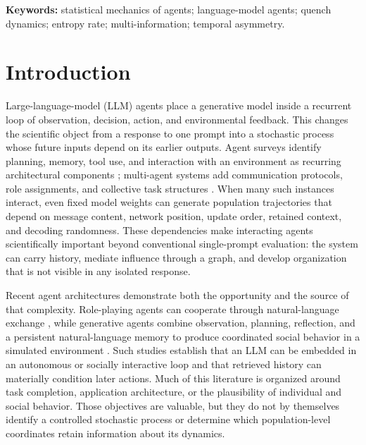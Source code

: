 \documentclass[12pt]{article}
\begin{document}
\noindent\textbf{Keywords:} statistical mechanics of agents; language-model
agents; quench dynamics; entropy rate; multi-information; temporal asymmetry.

\section{Introduction}
\label{sec:introduction}

Large-language-model (LLM) agents place a generative model inside a recurrent
loop of observation, decision, action, and environmental feedback.  This
changes the scientific object from a response to one prompt into a stochastic
process whose future inputs depend on its earlier outputs.  Agent surveys
identify planning, memory, tool use, and interaction with an environment as
recurring architectural components \cite{wang2024agents}; multi-agent systems
add communication protocols, role assignments, and collective task structures
\cite{guo2024multiagents}.  When many such instances interact, even fixed
model weights can generate population trajectories that depend on message
content, network position, update order, retained context, and decoding
randomness.  These dependencies make interacting agents scientifically
important beyond conventional single-prompt evaluation: the system can carry
history, mediate influence through a graph, and develop organization that is
not visible in any isolated response.

Recent agent architectures demonstrate both the opportunity and the source of
that complexity.  Role-playing agents can cooperate through natural-language
exchange \cite{li2023camel}, while generative agents combine observation,
planning, reflection, and a persistent natural-language memory to produce
coordinated social behavior in a simulated environment
\cite{park2023generative}.  Such studies establish that an LLM can be embedded
in an autonomous or socially interactive loop and that retrieved history can
materially condition later actions.  Much of this literature is organized
around task completion, application architecture, or the plausibility of
individual and social behavior.  Those objectives are valuable, but they do
not by themselves identify a controlled stochastic process or determine which
population-level coordinates retain information about its dynamics.
\end{document}
